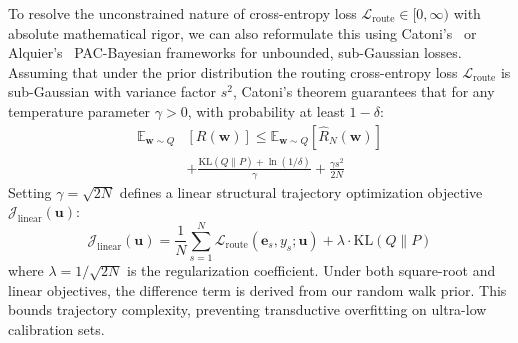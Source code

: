 To resolve the unconstrained nature of cross-entropy loss $\mathcal{L}_{\text{route}} \in [0, \infty)$ with absolute mathematical rigor, we can also reformulate this using Catoni's~\cite{catoni07pac} or Alquier's~\cite{alquier16users} PAC-Bayesian frameworks for unbounded, sub-Gaussian losses. Assuming that under the prior distribution the routing cross-entropy loss $\mathcal{L}_{\text{route}}$ is sub-Gaussian with variance factor $s^2$, Catoni's theorem guarantees that for any temperature parameter $\gamma > 0$, with probability at least $1-\delta$:
\begin{equation}
\label{eq:catoni}
\begin{split}
\mathbb{E}_{\mathbf{w} \sim Q} &[R(\mathbf{w})] \le \mathbb{E}_{\mathbf{w} \sim Q} [\hat{R}_N(\mathbf{w})] \\
&+ \frac{\text{KL}(Q \| P) + \ln(1/\delta)}{\gamma} + \frac{\gamma s^2}{2N}
\end{split}
\end{equation}
Setting $\gamma = \sqrt{2N}$ defines a linear structural trajectory optimization objective $\mathcal{J}_{\text{linear}}(\mathbf{u})$:
\begin{equation}
\label{eq:objective_linear}
\mathcal{J}_{\text{linear}}(\mathbf{u}) = \frac{1}{N} \sum_{s=1}^N \mathcal{L}_{\text{route}}(\mathbf{e}_s, y_s; \mathbf{u}) + \lambda \cdot \text{KL}(Q \| P)
\end{equation}
where $\lambda = 1/\sqrt{2N}$ is the regularization coefficient. Under both square-root and linear objectives, the difference term is derived from our random walk prior. This bounds trajectory complexity, preventing transductive overfitting on ultra-low calibration sets.

